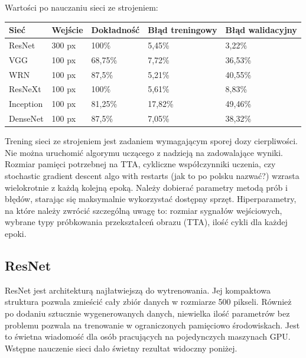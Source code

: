 \documentclass[12pt,a4paper,twoside,titlepage,openright]{book}
\begin{document}
Wartości po nauczaniu sieci ze strojeniem:
\begin{center}
    \begin{tabular}{ | l | l | l | l | l |}
    \hline
    Sieć & Wejście & Dokładność & Błąd treningowy & Błąd walidacyjny \\ \hline
    ResNet & 300 px & 100\% & 5,45\% & 3,22\% \\ \hline
    VGG & 100 px & 68,75\% & 7,72\% & 36,53\% \\ \hline
    WRN & 100 px & 87,5\% & 5,21\% & 40,55\% \\ \hline    
    ResNeXt & 100 px & 100\% & 5,61\% & 8,83\% \\ \hline
    Inception & 100 px & 81,25\% & 17,82\% & 49,46\% \\ \hline
    DenseNet & 100 px & 87,5\% & 7,05\% & 38,32\%\\ \hline
    \end{tabular}
\end{center}

Trening sieci ze strojeniem jest zadaniem wymagającym sporej dozy cierpliwości. Nie można uruchomić algorymu uczącego z nadzieją na zadowalające wyniki. Rozmiar pamięci potrzebnej na TTA, cykliczne współczynniki uczenia, czy stochastic gradient descent algo with restarts (jak to po polsku nazwać?) wzrasta wielokrotnie z każdą kolejną epoką. Należy dobierać parametry metodą prób i błędów, starając się maksymalnie wykorzystać dostępny sprzęt. Hiperparametry, na które należy zwrócić szczególną uwagę to: rozmiar sygnałów wejściowych, wybrane typy próbkowania przekształceń obrazu (TTA), ilość cykli dla każdej epoki.

\subsection{ResNet}
ResNet jest architekturą najłatwiejszą do wytrenowania. Jej kompaktowa struktura pozwala zmieścić cały zbiór danych w rozmiarze 500 pikseli. Również po dodaniu sztucznie wygenerowanych danych, niewielka ilość parametrów bez problemu pozwala na trenowanie w ograniczonych pamięciowo środowiskach. Jest to świetna wiadomość dla osób pracujących na pojedynczych maszynach GPU. Wstępne nauczenie sieci dało świetny rezultat widoczny poniżej.
\end{document}
